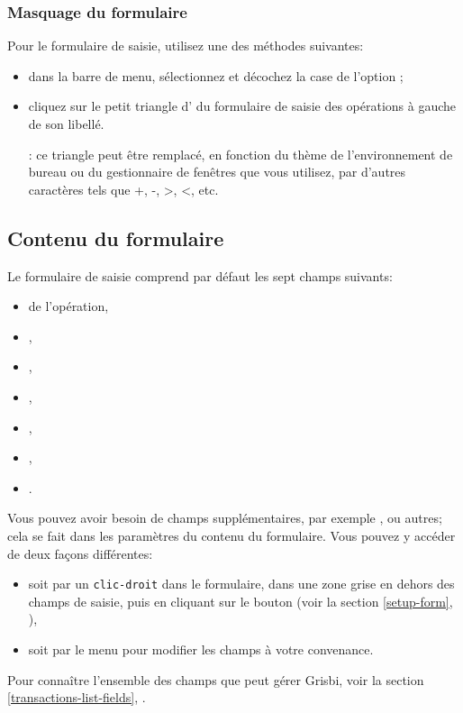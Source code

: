 \subsubsection{Masquage du formulaire\label{transactions-form-exposure-hide}}

Pour  le formulaire de saisie, utilisez une des méthodes suivantes:

\begin{itemize}
	\item dans la barre de menu, sélectionnez  et décochez la case de l'option ;
	\item cliquez sur le petit triangle d' du formulaire de saisie des opérations à gauche de son libellé.
	
	\Note{}: ce triangle peut être remplacé, en fonction du thème de l'environnement de bureau ou du gestionnaire de fenêtres que vous utilisez, par d'autres caractères tels que +, -, >, <, etc.
\end{itemize}


\subsection{Contenu du formulaire\label{transactions-form-content}}

Le formulaire de saisie comprend par défaut les sept champs suivants:
\begin{itemize}
	\item {} de l'opération,
	\item {},
	\item {},
	\item {},
	\item {},
	\item {},
	\item {}.
\end{itemize}
Vous pouvez avoir besoin de champs supplémentaires, par exemple ,  ou autres; cela se fait dans les paramètres du contenu du formulaire. Vous pouvez y accéder de deux façons différentes:
\begin{itemize}
	\item soit par un \texttt{clic-droit} dans le formulaire, dans une zone grise en dehors des champs de saisie, puis en cliquant sur le bouton  (voir la section \vref{setup-form}, ),
	\item soit par le menu  pour modifier les champs à votre convenance.
\end{itemize}
Pour connaître l'ensemble des champs que peut gérer Grisbi, voir la section \vref{transactions-list-fields}, .

